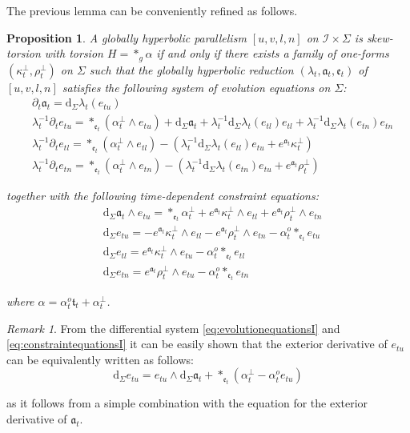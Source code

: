 \documentclass[10pt,reqno,a4paper]{amsart}
\theoremstyle{plain}
\newtheorem{prop}[thm]{Proposition}
\theoremstyle{definition}
\theoremstyle{remark}
\newtheorem{remark}[thm]{Remark}
\theoremstyle{remark}
\newcommand{\frt}{\mathfrak{t}}
\def\dd{\mathrm{d}}
\def\cI{\mathcal{I}}
\def\fra{\mathfrak{a}}
\def\fre{\mathfrak{e}}
\renewcommand{\(}{ (}
\renewcommand{\)}{ )}
\begin{document}
\noindent
The previous lemma can be conveniently refined as follows.
\begin{prop}
\label{prop:evolutionsystem}
A globally hyperbolic parallelism $[u,v,l,n]$ on $\cI\times \Sigma$ is skew-torsion with torsion $H =  \ast_g\alpha$ if and only if there exists a family of one-forms $(\kappa^{\perp}_t , \rho^{\perp}_t)$ on $\Sigma$ such that the globally hyperbolic reduction $(\lambda_t,\fra_t,\fre_t)$ of $[u,v,l,n]$ satisfies the following system of evolution equations on $\Sigma$:
\begin{eqnarray}
& \partial_t \fra_t =  \dd_{\Sigma} \lambda_t( e_{tu}) \nonumber \\
&  \lambda_t^{-1} \partial_t e_{tu} = \ast_{\fre_t} (\alpha^{\perp}_t \wedge e_{tu}) + \dd_{\Sigma} \fra_t + \lambda_t^{-1} \dd_{\Sigma} \lambda_t (e_{tl}) e_{tl} + \lambda_t^{-1} \dd_{\Sigma} \lambda_t (e_{tn}) e_{tn} \nonumber \\
& \lambda_t^{-1} \partial_t e_{tl} = \ast_{\fre_t} (\alpha^{\perp}_t \wedge e_{tl}) - (\lambda_t^{-1} \dd_{\Sigma} \lambda_t (e_{tl}) e_{tu} + e^{\fra_t}\kappa^{\perp}_t) \label{eq:evolutionequationsI} \\
& \lambda_t^{-1} \partial_t e_{tn} = \ast_{\fre_t} (\alpha^{\perp}_t\wedge e_{tn})  - (\lambda_t^{-1} \dd_{\Sigma} \lambda_t (e_{tn}) e_{tu} + e^{\fra_t}\rho^{\perp}_t) \nonumber
\end{eqnarray}

\noindent
together with the following time-dependent constraint equations:
\begin{eqnarray}
&  \dd_{\Sigma} \fra_t \wedge e_{tu} =  \ast_{\fre_t}\alpha^{\perp}_t     +    e^{\fra_t} \kappa^{\perp}_t \wedge e_{tl} +   e^{\fra_t} \rho^{\perp}_t \wedge e_{tn}   \nonumber \\
& \dd_{\Sigma}  e_{tu}  =  - e^{\fra_t} \kappa^{\perp}_t \wedge e_{tl} - e^{\fra_t} \rho^{\perp}_t \wedge e_{tn} -   \alpha^o_t \ast_{\fre_t} e_{tu} \nonumber \\
& \dd_{\Sigma} e_{tl} = e^{\fra_t} \kappa^{\perp}_t\wedge e_{tu} - \alpha^o_t \ast_{\fre_t} e_{tl} \label{eq:constraintequationsI}\\
& \dd_{\Sigma} e_{tn} = e^{\fra_t} \rho^{\perp}_t\wedge e_{tu}  - \alpha^o_t \ast_{\fre_t} e_{tn} \nonumber
\end{eqnarray}

\noindent
where $\alpha = \alpha^o_t \frt_t + \alpha^{\perp}_t$. 
\end{prop}  

\begin{remark}
From the differential system \eqref{eq:evolutionequationsI} and \eqref{eq:constraintequationsI} it can be easily shown that the exterior derivative of $e_{tu}$ can be equivalently written as follows:
\begin{equation*}
\dd_{\Sigma}  e_{tu}  = e_{tu}\wedge \dd_{\Sigma} \fra_t + \ast_{\fre_t}(\alpha^{\perp}_t  - \alpha^o_t e_{tu})
\end{equation*}

\noindent
as it follows from a simple combination with the equation for the exterior derivative of $\fra_t$. 
\end{remark}
\end{document}
